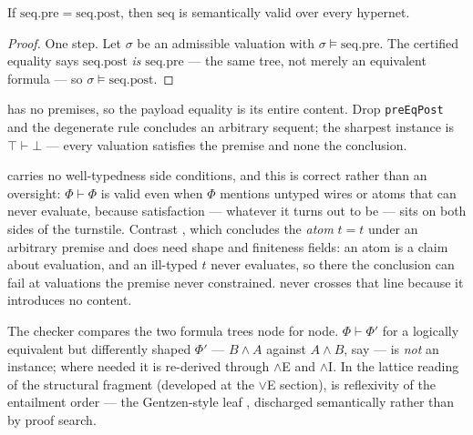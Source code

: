 \begin{bthm}\label{thm:ax-sound}
If $\mathrm{seq.pre} = \mathrm{seq.post}$, then $\mathrm{seq}$ is
semantically valid over every hypernet.
\end{bthm}
\begin{proof}
One step. Let $\sigma$ be an admissible valuation with $\sigma \models
\mathrm{seq.pre}$. The certified equality says $\mathrm{seq.post}$
\emph{is} $\mathrm{seq.pre}$ --- the same tree, not merely an equivalent
formula --- so $\sigma \models \mathrm{seq.post}$.
\end{proof}

\begin{bremark}\label{rem:ax-hyp}
 has no premises, so the payload equality is its entire
content. Drop \texttt{preEqPost} and the degenerate rule concludes an
arbitrary sequent; the sharpest instance is $\top \vdash \bot$ ---
every valuation satisfies the premise and none the conclusion.
\end{bremark}

\begin{bremark}\label{rem:ax-typing}
 carries no well-typedness side conditions, and this is
correct rather than an oversight: $\Phi \vdash \Phi$ is valid even when
$\Phi$ mentions untyped wires or atoms that can never evaluate, because
satisfaction --- whatever it turns out to be --- sits on both sides of
the turnstile. Contrast , which concludes the
\emph{atom} $t = t$ under an arbitrary premise and does need shape and
finiteness fields: an atom is a claim about evaluation, and an ill-typed
$t$ never evaluates, so there the conclusion can fail at valuations the
premise never constrained.  never crosses that line because
it introduces no content.
\end{bremark}

\begin{bremark}
The checker compares the two formula trees node for node.
$\Phi \vdash \Phi'$ for a logically equivalent but differently shaped
$\Phi'$ --- $B \wedge A$ against $A \wedge B$, say --- is \emph{not} an
 instance; where needed it is re-derived through $\wedge$E
and $\wedge$I. In the lattice reading of the structural fragment
(developed at the $\vee$E section),  is reflexivity of the
entailment order --- the Gentzen-style leaf \cite{gentzen1935},
discharged semantically rather than by proof search.
\end{bremark}

